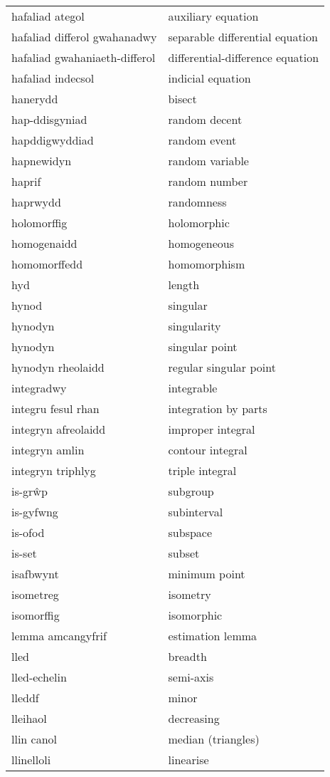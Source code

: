 \begin{supertabular}{p{0.22\textwidth}p{0.22\textwidth}}
hafaliad ategol & auxiliary equation \\
hafaliad differol gwahanadwy & separable differential equation \\
hafaliad gwahaniaeth-differol & differential-difference equation \\
hafaliad indecsol & indicial equation \\
hanerydd & bisect \\
hap-ddisgyniad & random decent \\
hapddigwyddiad & random event \\
hapnewidyn & random variable \\
haprif & random number \\
haprwydd & randomness \\
holomorffig & holomorphic \\
homogenaidd & homogeneous \\
homomorffedd & homomorphism \\
hyd & length \\
hynod & singular \\
hynodyn & singularity \\
hynodyn & singular point \\
hynodyn rheolaidd & regular singular point \\
integradwy & integrable \\
integru fesul rhan & integration by parts \\
integryn afreolaidd & improper integral \\
integryn amlin & contour integral \\
integryn triphlyg & triple integral \\
is-grŵp & subgroup \\
is-gyfwng & subinterval \\
is-ofod & subspace \\
is-set & subset \\
isafbwynt & minimum point \\
isometreg & isometry \\
isomorffig & isomorphic \\
lemma amcangyfrif & estimation lemma \\
lled & breadth \\
lled-echelin & semi-axis \\
lleddf & minor \\
lleihaol & decreasing \\
llin canol & median (triangles) \\
llinelloli & linearise \\

\end{supertabular}
